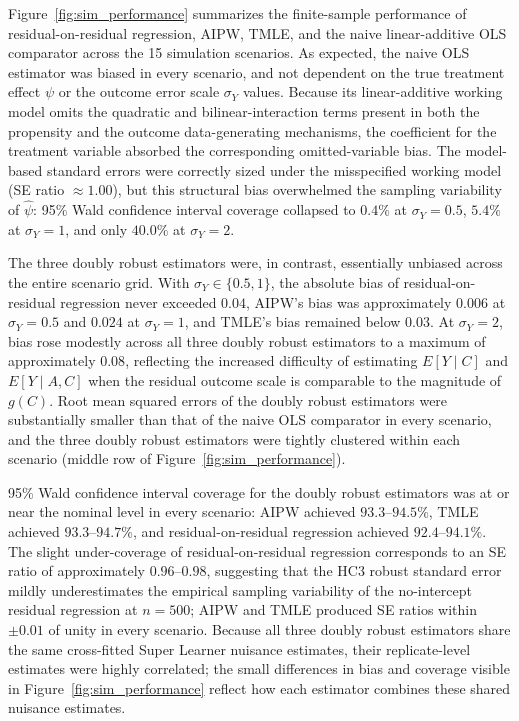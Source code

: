\documentclass[12pt]{article}
\begin{document}
Figure~\ref{fig:sim_performance} summarizes the finite-sample performance of residual-on-residual regression, AIPW, TMLE, and the naive linear-additive OLS comparator across the 15 simulation scenarios. As expected, the naive OLS estimator was biased in every scenario, and not dependent on the true treatment effect $\psi$ or the outcome error scale $\sigma_Y$ values. Because its linear-additive working model omits the quadratic and bilinear-interaction terms present in both the propensity and the outcome data-generating mechanisms, the coefficient for the treatment variable absorbed the corresponding omitted-variable bias. The model-based standard errors were correctly sized under the misspecified working model (SE ratio $\approx 1.00$), but this structural bias overwhelmed the sampling variability of $\hat{\psi}$: 95\% Wald confidence interval coverage collapsed to $0.4\%$ at $\sigma_Y = 0.5$, $5.4\%$ at $\sigma_Y = 1$, and only $40.0\%$ at $\sigma_Y = 2$.

The three doubly robust estimators were, in contrast, essentially unbiased across the entire scenario grid. With $\sigma_Y \in \{0.5, 1\}$, the absolute bias of residual-on-residual regression never exceeded $0.04$, AIPW's bias was approximately $0.006$ at $\sigma_Y = 0.5$ and $0.024$ at $\sigma_Y = 1$, and TMLE's bias remained below $0.03$. At $\sigma_Y = 2$, bias rose modestly across all three doubly robust estimators to a maximum of approximately $0.08$, reflecting the increased difficulty of estimating $E[Y \mid C]$ and $E[Y \mid A, C]$ when the residual outcome scale is comparable to the magnitude of $g(C)$. Root mean squared errors of the doubly robust estimators were substantially smaller than that of the naive OLS comparator in every scenario, and the three doubly robust estimators were tightly clustered within each scenario (middle row of Figure~\ref{fig:sim_performance}).

95\% Wald confidence interval coverage for the doubly robust estimators was at or near the nominal level in every scenario: AIPW achieved $93.3$--$94.5\%$, TMLE achieved $93.3$--$94.7\%$, and residual-on-residual regression achieved $92.4$--$94.1\%$. The slight under-coverage of residual-on-residual regression corresponds to an SE ratio of approximately $0.96$--$0.98$, suggesting that the HC3 robust standard error mildly underestimates the empirical sampling variability of the no-intercept residual regression at $n = 500$; AIPW and TMLE produced SE ratios within $\pm 0.01$ of unity in every scenario. Because all three doubly robust estimators share the same cross-fitted Super Learner nuisance estimates, their replicate-level estimates were highly correlated; the small differences in bias and coverage visible in Figure~\ref{fig:sim_performance} reflect how each estimator combines these shared nuisance estimates.
\end{document}
